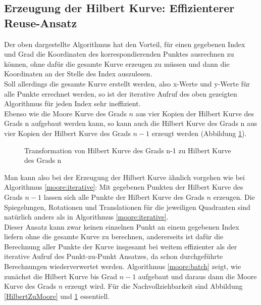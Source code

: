 \documentclass[course=erap]{aspdoc}
\begin{document}
\subsection{Erzeugung der Hilbert Kurve: Effizienterer Reuse-Ansatz}
Der oben dargestellte Algorithmus hat den Vorteil, für einen gegebenen Index und Grad die Koordinaten des korrespondierenden Punktes ausrechnen zu können, ohne dafür die gesamte Kurve erzeugen zu müssen und dann die Koordinaten an der Stelle des Index auszulesen.\\ 
Soll allerdings die gesamte Kurve erstellt werden, also x-Werte und y-Werte für alle Punkte errechnet werden, so ist der iterative Aufruf des oben gezeigten Algorithmus für jeden Index sehr ineffizient.\\
Ebenso wie die Moore Kurve des Grads $n$ aus vier Kopien der Hilbert Kurve des Grads n aufgebaut werden kann, so kann auch die Hilbert Kurve des Grads n aus vier Kopien der Hilbert Kurve des Grads $n-1$ erzeugt werden (Abbildung \ref{HilbertZuHilbert}).
\begin{figure}[h]
\centering
\def\svgwidth{240pt}

\caption{Transformation von Hilbert Kurve des Grads n-1 zu Hilbert Kurve des Grads n}
\label{HilbertZuHilbert}
\end{figure}
Man kann also bei der Erzeugung der Hilbert Kurve ähnlich vorgehen wie bei Algorithmus \ref{moore:iterative}: Mit gegebenen Punkten der Hilbert Kurve des Grads $n-1$ lassen sich alle Punkte der Hilbert Kurve des Grads $n$ erzeugen. 
Die Spiegelungen, Rotationen und Translationen für die jeweiligen Quadranten sind natürlich anders als in Algorithmus \ref{moore:iterative}. \\
Dieser Ansatz kann zwar keinen einzelnen Punkt an einem gegebenen Index liefern ohne die gesamte Kurve zu berechnen, andererseits ist dafür die Berechnung aller Punkte der Kurve insgesamt bei weitem effizienter als der iterative Aufruf des Punkt-zu-Punkt Ansatzes, da schon durchgeführte Berechnungen wiederverwertet werden. Algorithmus \ref{moore:batch} zeigt, wie zunächst die Hilbert Kurve bis Grad $n-1$ aufgebaut und daraus dann die Moore Kurve des Grads $n$ erzeugt wird. Für die Nachvollziehbarkeit sind Abbildung \ref{HilbertZuMoore} und \ref{HilbertZuHilbert} essentiell.
\end{document}
